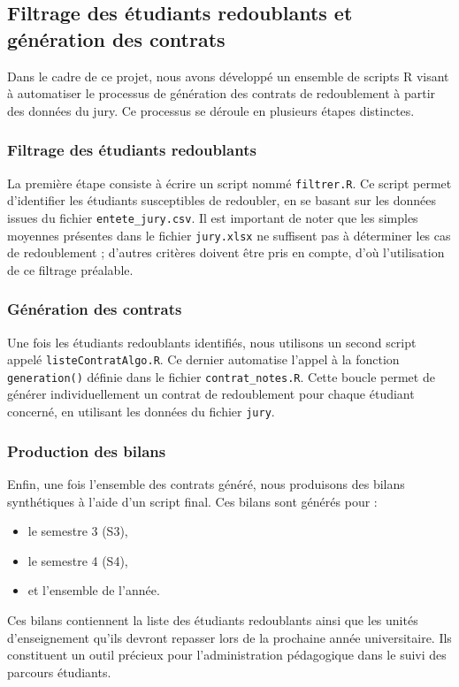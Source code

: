\subsection{Filtrage des étudiants redoublants et génération des contrats}

Dans le cadre de ce projet, nous avons développé un ensemble de scripts R visant à automatiser le processus de génération des contrats de redoublement à partir des données du jury. Ce processus se déroule en plusieurs étapes distinctes.

\subsubsection{Filtrage des étudiants redoublants}

La première étape consiste à écrire un script nommé \texttt{filtrer.R}. Ce script permet d'identifier les étudiants susceptibles de redoubler, en se basant sur les données issues du fichier \texttt{entete\_jury.csv}. Il est important de noter que les simples moyennes présentes dans le fichier \texttt{jury.xlsx} ne suffisent pas à déterminer les cas de redoublement ; d'autres critères doivent être pris en compte, d'où l'utilisation de ce filtrage préalable.

\subsubsection{Génération des contrats}

Une fois les étudiants redoublants identifiés, nous utilisons un second script appelé \texttt{listeContratAlgo.R}. Ce dernier automatise l’appel à la fonction \texttt{generation()} définie dans le fichier \texttt{contrat\_notes.R}. Cette boucle permet de générer individuellement un contrat de redoublement pour chaque étudiant concerné, en utilisant les données du fichier \texttt{jury}.

\subsubsection{Production des bilans}

Enfin, une fois l’ensemble des contrats généré, nous produisons des bilans synthétiques à l’aide d’un script final. Ces bilans sont générés pour :
\begin{itemize}
    \item le semestre 3 (S3),
    \item le semestre 4 (S4),
    \item et l’ensemble de l’année.
\end{itemize}

Ces bilans contiennent la liste des étudiants redoublants ainsi que les unités d’enseignement qu’ils devront repasser lors de la prochaine année universitaire. Ils constituent un outil précieux pour l’administration pédagogique dans le suivi des parcours étudiants.

 